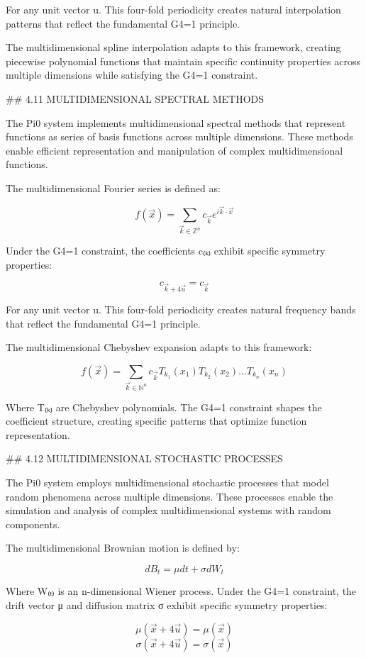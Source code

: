For any unit vector u⃗. This four-fold periodicity creates natural interpolation patterns that reflect the fundamental G4=1 principle.

The multidimensional spline interpolation adapts to this framework, creating piecewise polynomial functions that maintain specific continuity properties across multiple dimensions while satisfying the G4=1 constraint.

## 4.11 MULTIDIMENSIONAL SPECTRAL METHODS

The Pi0 system implements multidimensional spectral methods that represent functions as series of basis functions across multiple dimensions. These methods enable efficient representation and manipulation of complex multidimensional functions.

The multidimensional Fourier series is defined as:

$$f(\vec{x}) = \sum_{\vec{k} \in \mathbb{Z}^n} c_{\vec{k}} e^{i\vec{k}\cdot\vec{x}}$$

Under the G4=1 constraint, the coefficients c₍ₖ₎ exhibit specific symmetry properties:

$$c_{\vec{k}+4\vec{u}} = c_{\vec{k}}$$

For any unit vector u⃗. This four-fold periodicity creates natural frequency bands that reflect the fundamental G4=1 principle.

The multidimensional Chebyshev expansion adapts to this framework:

$$f(\vec{x}) = \sum_{\vec{k} \in \mathbb{N}^n} c_{\vec{k}} T_{k_1}(x_1) T_{k_2}(x_2) \ldots T_{k_n}(x_n)$$

Where T₍ₖ₎ are Chebyshev polynomials. The G4=1 constraint shapes the coefficient structure, creating specific patterns that optimize function representation.

## 4.12 MULTIDIMENSIONAL STOCHASTIC PROCESSES

The Pi0 system employs multidimensional stochastic processes that model random phenomena across multiple dimensions. These processes enable the simulation and analysis of complex multidimensional systems with random components.

The multidimensional Brownian motion is defined by:

$$dB_t = \mu dt + \sigma dW_t$$

Where W₍ₜ₎ is an n-dimensional Wiener process. Under the G4=1 constraint, the drift vector μ and diffusion matrix σ exhibit specific symmetry properties:

$$\mu(\vec{x}+4\vec{u}) = \mu(\vec{x})$$
$$\sigma(\vec{x}+4\vec{u}) = \sigma(\vec{x})$$


